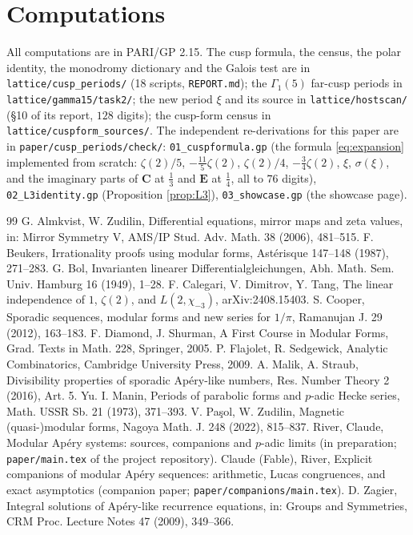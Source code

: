 \documentclass[11pt]{amsart}
\theoremstyle{definition}
\theoremstyle{remark}
\begin{document}
\section{Computations}\label{sec:comp}
All computations are in PARI/GP 2.15. The cusp formula, the census, the polar identity, the monodromy dictionary and the Galois test are in \texttt{lattice/cusp\_periods/} (18 scripts, \texttt{REPORT.md}); the $\Gamma_1(5)$ far-cusp periods in \texttt{lattice/gamma15/task2/}; the new period $\xi$ and its source in \texttt{lattice/hostscan/} (\S10 of its report, $128$ digits); the cusp-form census in \texttt{lattice/cuspform\_sources/}. The independent re-derivations for this paper are in \texttt{paper/cusp\_periods/check/}: \texttt{01\_cuspformula.gp} (the formula \eqref{eq:expansion} implemented from scratch: $\zeta(2)/5$, $-\tfrac{11}5\zeta(2)$, $\zeta(2)/4$, $-\tfrac34\zeta(2)$, $\xi$, $\sigma(\xi)$, and the imaginary parts of $\mathbf C$ at $\tfrac13$ and $\mathbf E$ at $\tfrac14$, all to $76$ digits), \texttt{02\_L3identity.gp} (Proposition \ref{prop:L3}), \texttt{03\_showcase.gp} (the showcase page).

\begin{thebibliography}{99}
 G. Almkvist, W. Zudilin, Differential equations, mirror maps and zeta values, in: Mirror Symmetry V, AMS/IP Stud. Adv. Math. 38 (2006), 481--515.
 F. Beukers, Irrationality proofs using modular forms, Ast\'erisque 147--148 (1987), 271--283.
 G. Bol, Invarianten linearer Differentialgleichungen, Abh. Math. Sem. Univ. Hamburg 16 (1949), 1--28.
 F. Calegari, V. Dimitrov, Y. Tang, The linear independence of $1$, $\zeta(2)$, and $L(2,\chi_{-3})$, arXiv:2408.15403.
 S. Cooper, Sporadic sequences, modular forms and new series for $1/\pi$, Ramanujan J. 29 (2012), 163--183.
 F. Diamond, J. Shurman, A First Course in Modular Forms, Grad. Texts in Math. 228, Springer, 2005.
 P. Flajolet, R. Sedgewick, Analytic Combinatorics, Cambridge University Press, 2009.
 A. Malik, A. Straub, Divisibility properties of sporadic Ap\'ery-like numbers, Res. Number Theory 2 (2016), Art. 5.
 Yu. I. Manin, Periods of parabolic forms and $p$-adic Hecke series, Math. USSR Sb. 21 (1973), 371--393.
 V. Pa\c sol, W. Zudilin, Magnetic (quasi-)modular forms, Nagoya Math. J. 248 (2022), 815--837.
 River, Claude, Modular Ap\'ery systems: sources, companions and $p$-adic limits (in preparation; \texttt{paper/main.tex} of the project repository).
 Claude (Fable), River, Explicit companions of modular Ap\'ery sequences: arithmetic, Lucas congruences, and exact asymptotics (companion paper; \texttt{paper/companions/main.tex}).
 D. Zagier, Integral solutions of Ap\'ery-like recurrence equations, in: Groups and Symmetries, CRM Proc. Lecture Notes 47 (2009), 349--366.
\end{thebibliography}
\end{document}
